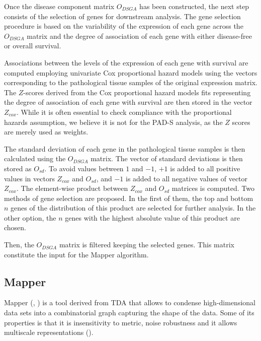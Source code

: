 Once the disease component matrix \(O_{DSGA}\) has been constructed, the next step consists of the selection of genes for downstream analysis. The gene selection procedure is based on the variability of the expression of each gene across the \(O_{DSGA}\) matrix and the degree of association of each gene with either disease-free or overall survival.

Associations between the levels of the expression of each gene with survival are computed employing univariate Cox proportional hazard models using the vectors corresponding to the pathological tissue samples of the original expression matrix. The \(Z\)-scores derived from the Cox proportional hazard models fits representing the degree of association of each gene with survival are then stored in the vector \(Z_{cox}\). While it is often essential to check compliance with the proportional hazards assumption, we believe it is not for the PAD-S analysis, as the \(Z\) scores are merely used as weights.

The standard deviation of each gene in the pathological tissue samples is then calculated using the \(O_{DSGA}\) matrix.
The vector of standard deviations is then stored as \(O_{sd}\). To avoid values between \(1\) and \(-1\), \(+1\) is added to all positive values in vectors \(Z_{cox}\) and \(O_{sd}\), and \(-1\) is added to all negative values of vector \(Z_{cox}\). The element-wise product between \(Z_{cox}\) and \(O_{sd}\) matrices is computed. Two methods of gene selection are proposed. In the first of them, the top and bottom \(n\) genes of the distribution of this product are selected for further analysis. In the other option, the \(n\) genes with the highest absolute value of this product are chosen.

Then, the \(O_{DSGA}\) matrix is filtered keeping the selected genes. This matrix constitute the input for the Mapper algorithm.

\hypertarget{section2.3}{%
\subsection{Mapper}\label{section2.3}}

Mapper (\citet{singh2007topological}, \citet{lum2013extracting}) is a tool derived from TDA that allows to condense high-dimensional data sets into a combinatorial graph capturing the shape of the data. Some of its properties is that it is insensitivity to metric, noise robustness and it allows multiscale representations (\citet{carlsson2009topology}).

